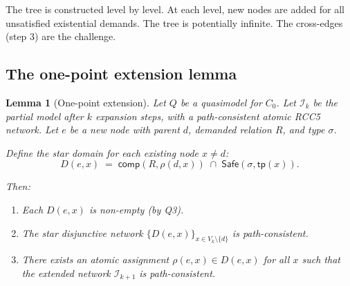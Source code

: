 \documentclass[a4paper,11pt]{article}
\newtheorem{lemma}[theorem]{Lemma}
\theoremstyle{definition}
\newcommand{\interp}{\ensuremath{\mathcal{I}}}
\newcommand{\comp}{\ensuremath{\mathsf{comp}}}
\newcommand{\tp}{\ensuremath{\mathsf{tp}}}
\newcommand{\Safe}{\ensuremath{\mathsf{Safe}}}
\begin{document}
The tree is constructed level by level.  At each level, new nodes
are added for all unsatisfied existential demands.  The tree is
potentially infinite.  The cross-edges (step 3) are the challenge.

\subsection{The one-point extension lemma}

\begin{lemma}[One-point extension]
\label{lem:extension}
Let $Q$ be a quasimodel for $C_0$.  Let $\interp_k$ be the
partial model after $k$ expansion steps, with a path-consistent
atomic RCC5 network.  Let $e$ be a new node with parent $d$,
demanded relation $R$, and type $\sigma$.

Define the \emph{star domain} for each existing node $x \neq d$:
\[
  D(e, x) \;=\; \comp(R, \rho(d, x)) \;\cap\;
  \Safe(\sigma, \tp(x)).
\]

Then\textup{:}
\begin{enumerate}[nosep,label=\textup{(\alph*)}]
  \item Each $D(e, x)$ is non-empty \textup{(}by Q3\textup{)}.
  \item The star disjunctive network
    $\{D(e, x)\}_{x \in V_k \setminus \{d\}}$ is
    path-consistent.
  \item There exists an atomic assignment
    $\rho(e, x) \in D(e, x)$ for all $x$ such that the
    extended network $\interp_{k+1}$ is path-consistent.
\end{enumerate}
\end{lemma}
\end{document}
